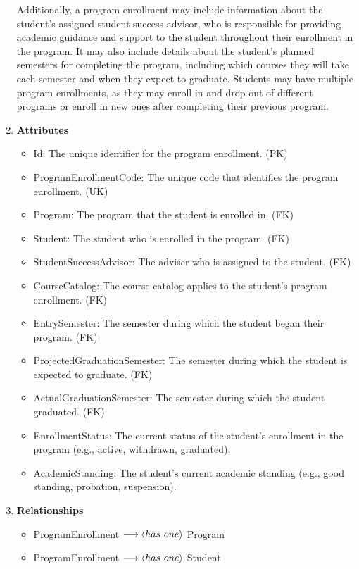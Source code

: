 \documentclass[12pt]{article}
\begin{document}
\begin{appendices}
\begin{enumerate}[label=(\roman*)]
    Additionally, a program enrollment may include information about the student's assigned student success advisor, who is responsible for providing academic guidance and support to the student throughout their enrollment in the program. It may also include details about the student's planned semesters for completing the program, including which courses they will take each semester and when they expect to graduate. Students may have multiple program enrollments, as they may enroll in and drop out of different programs or enroll in new ones after completing their previous program.
    \item[] \textbf{Attributes}
    \begin{itemize}
        \item Id: The unique identifier for the program enrollment. (PK)
        \item ProgramEnrollmentCode: The unique code that identifies the program enrollment. (UK)
        \item Program: The program that the student is enrolled in. (FK)
        \item Student: The student who is enrolled in the program. (FK)
        \item StudentSuccessAdvisor: The adviser who is assigned to the student. (FK)
        \item CourseCatalog: The course catalog applies to the student's program enrollment. (FK)
        \item EntrySemester: The semester during which the student began their program. (FK)
        \item ProjectedGraduationSemester: The semester during which the student is expected to graduate. (FK)
        \item ActualGraduationSemester: The semester during which the student graduated. (FK)
        \item EnrollmentStatus: The current status of the student's enrollment in the program (e.g., active, withdrawn, graduated).
        \item AcademicStanding: The student's current academic standing (e.g., good standing, probation, suspension).
    \end{itemize}
    \item[] \textbf{Relationships}
    \begin{itemize}
        \item ProgramEnrollment $ \longrightarrow \langle has \hspace{0.125cm} one \rangle $ Program
        \item ProgramEnrollment $ \longrightarrow \langle has \hspace{0.125cm} one \rangle $ Student

\end{itemize}
\end{enumerate}
\end{appendices}
\end{document}
